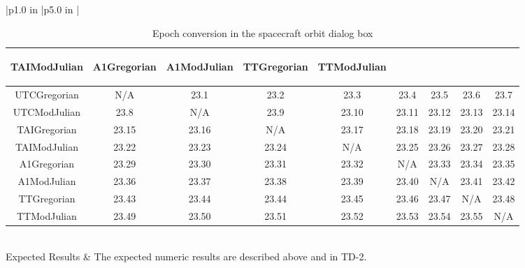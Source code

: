 \begin{table}[htbp!]
\begin{tabular}{|p{1.0 in} |p{5.0 in} |}
\begin{centering}
\begin{tabular}{|c|c|c|c|c|c|c|c|c|}
             {\begin{sideways}\parbox{2.5cm}{TAIModJulian}\end{sideways}} &
             {\begin{sideways}\parbox{2.5cm}{A1Gregorian}\end{sideways}}  &
             {\begin{sideways}\parbox{2.5cm}{A1ModJulian}\end{sideways}}  &
             {\begin{sideways}\parbox{2.5cm}{TTGregorian}\end{sideways}}  &
             {\begin{sideways}\parbox{2.5cm}{TTModJulian}\end{sideways}}  \\ \hline
             UTCGregorian & N/A & 23.1 & 23.2 & 23.3 & 23.4 & 23.5 & 23.6 & 23.7 \\ \hline
             UTCModJulian & 23.8 & N/A & 23.9 & 23.10 & 23.11 & 23.12 & 23.13 & 23.14\\ \hline
             TAIGregorian & 23.15 & 23.16 & N/A & 23.17 & 23.18 & 23.19 & 23.20 & 23.21\\ \hline
             TAIModJulian & 23.22 & 23.23 & 23.24 & N/A & 23.25 & 23.26 & 23.27 & 23.28\\ \hline
             A1Gregorian & 23.29 & 23.30 & 23.31 & 23.32 & N/A & 23.33 & 23.34 & 23.35\\ \hline
             A1ModJulian & 23.36 & 23.37 & 23.38 & 23.39 & 23.40 &  N/A & 23.41 & 23.42\\ \hline
             TTGregorian & 23.43 & 23.44 & 23.44 & 23.45 & 23.46 & 23.47 & N/A & 23.48\\ \hline
             TTModJulian & 23.49 & 23.50 & 23.51 & 23.52 & 23.53 & 23.54 & 23.55 & N/A\\ \hline
          \end{tabular}
          \end{centering} \vspace{0.1 in}\\
         \hline
         Expected Results & The expected numeric results are described above and in TD-2.\\
      \hline
\end{tabular}
   \label{Table:STC-23}
   \caption{Epoch conversion in the spacecraft orbit dialog box}
\end{table} 